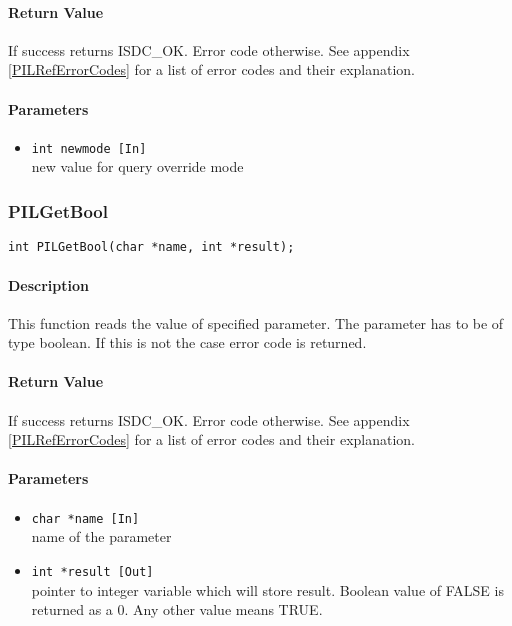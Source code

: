 \paragraph{Return Value\\}
If success returns ISDC\_OK. Error code otherwise. See appendix \ref{PILRefErrorCodes}
for a list of error codes and their explanation.

\paragraph{Parameters}
\begin{itemize}
\item
{\tt int newmode [In] } \\
new value for query override mode
\end{itemize}



\subsubsection{PILGetBool}

\begin{verbatim}
int PILGetBool(char *name, int *result); 
\end{verbatim}

\paragraph{Description\\}
This function reads the value of specified parameter. The parameter has to
be of type
boolean. If this is not the case error code is returned. 

\paragraph{Return Value\\}
If success returns ISDC\_OK. Error code otherwise. See appendix \ref{PILRefErrorCodes}
for a list of error codes and their explanation.

\paragraph{Parameters}
\begin{itemize}
\item
{\tt char *name [In] } \\
name of the parameter 
\item
{\tt int *result [Out] } \\
pointer to integer variable which will store result. Boolean value of
FALSE is returned as a 0. Any other value means TRUE. 
\end{itemize}



